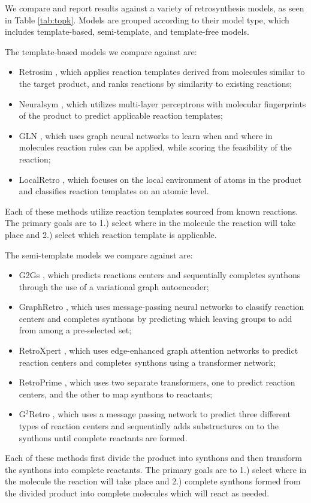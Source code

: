 \documentclass{article}
\begin{document}
We compare and report results against a variety of retrosynthesis models, as seen in Table \ref{tab:topk}. Models are grouped according to their model type, which includes template-based, semi-template, and template-free models. 

The template-based models we compare against are:
\begin{itemize}
    \item Retrosim \cite{coley2017computer}, which applies reaction templates derived from molecules similar to the target product, and ranks reactions by similarity to existing reactions; 
    \item Neuralsym \cite{segler2017neural}, which utilizes multi-layer perceptrons with molecular fingerprints of the product to predict applicable reaction templates;
    \item GLN \cite{dai2019retrosynthesis}, which uses graph neural networks to learn when and where in molecules reaction rules can be applied, while scoring the feasibility of the reaction;
    \item LocalRetro \cite{chen2021deep}, which focuses on the local environment of atoms in the product and classifies reaction templates on an atomic level.
\end{itemize}
Each of these methods utilize reaction templates sourced from known reactions. The primary goals are to 1.) select where in the molecule the reaction will take place and 2.) select which reaction template is applicable.

The semi-template models we compare against are:
\begin{itemize}
    \item G2Gs \cite{shi2020graph}, which predicts reactions centers and sequentially completes synthons through the use of a variational graph autoencoder;
    \item GraphRetro \cite{somnath2021learning}, which uses message-passing neural networks to classify reaction centers and completes synthons by predicting which leaving groups to add from among a pre-selected set;
    \item RetroXpert \cite{yan2020retroxpert}, which uses edge-enhanced graph attention networks to predict reaction centers and completes synthons using a transformer network;
    \item RetroPrime \cite{wang2021retroprime}, which uses two separate transformers, one to predict reaction centers, and the other to map synthons to reactants;
    \item G$^2$Retro \cite{chen2023g}, which uses a message passing network to predict three different types of reaction centers and sequentially adds substructures on to the synthons until complete reactants are formed.
\end{itemize}
Each of these methods first divide the product into synthons and then transform the synthons into complete reactants. The primary goals are to 1.) select where in the molecule the reaction will take place and 2.) complete synthons formed from the divided product into complete molecules which will react as needed.
\end{document}
